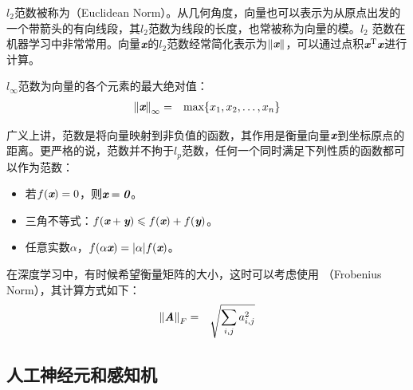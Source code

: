 \parinterval $ l_2 $范数被称为{\small{}}（Euclidean Norm）。从几何角度，向量也可以表示为从原点出发的一个带箭头的有向线段，其$ l_2 $范数为线段的长度，也常被称为向量的模。$ l_2 $ 范数在机器学习中非常常用。向量$ {\textbf{\em x}} $的$ l_2 $范数经常简化表示为$ \Vert{\textbf{\em x}}\Vert $，可以通过点积$ {\textbf{\em x}}^{\textrm T}{\textbf{\em x}} $进行计算。

\parinterval $ l_{\infty} $范数为向量的各个元素的最大绝对值：
\begin{eqnarray}
{\Vert{\textbf{\em x}}\Vert}_{\infty}&=&{\textrm{max}}\{x_1,x_2,\dots,x_n\}
\label{eq:9-17}
\end{eqnarray}

\parinterval 广义上讲，范数是将向量映射到非负值的函数，其作用是衡量向量$ {\textbf{\em x}} $到坐标原点的距离。更严格的说，范数并不拘于$ l_p $范数，任何一个同时满足下列性质的函数都可以作为范数：

\begin{itemize}
\vspace{0.5em}
\item 若$ f({\textbf{\em x}})=0 $，则$ {\textbf{\em x}}={\textbf{\em 0}} $。
\vspace{0.5em}
\item 三角不等式：$ f({\textbf{\em x}}+{\textbf{\em y}})\leqslant f({\textbf{\em x}})+f({\textbf{\em y}}) $。
\vspace{0.5em}
\item 任意实数$ \alpha $，$ f(\alpha {\textbf{\em x}})=\vert \alpha \vert f({\textbf{\em x}}) $。
\vspace{0.5em}
\end{itemize}

\parinterval 在深度学习中，有时候希望衡量矩阵的大小，这时可以考虑使用 {\small{}}（Frobenius Norm），其计算方式如下：
\begin{eqnarray}
{\Vert{\textbf{\em A}}\Vert}_F&=&\sqrt{\sum_{i,j} a_{i,j}^2}
\label{eq:9-18}
\end{eqnarray}

\subsection{人工神经元和感知机}

